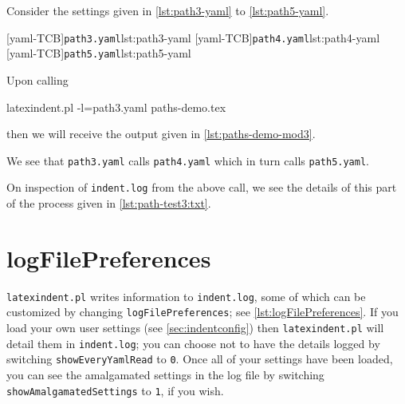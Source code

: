  \begin{example}
  Consider the settings given in \cref{lst:path3-yaml} to \cref{lst:path5-yaml}.

  \begin{cmhtcbraster}[raster columns=3,
    raster left skip=-3.5cm,
    raster right skip=-2cm,
    raster column skip=.03\linewidth]
   [yaml-TCB]{\texttt{path3.yaml}}{lst:path3-yaml}
   [yaml-TCB]{\texttt{path4.yaml}}{lst:path4-yaml}
   [yaml-TCB]{\texttt{path5.yaml}}{lst:path5-yaml}
  \end{cmhtcbraster}

  Upon calling

  \begin{commandshell}
latexindent.pl -l=path3.yaml paths-demo.tex
\end{commandshell}

  then we will receive the output given in \cref{lst:paths-demo-mod3}.


  We see that \texttt{path3.yaml} calls \texttt{path4.yaml} which in turn calls
  \texttt{path5.yaml}.

  On inspection of \texttt{indent.log} from the above call, we see the details of this
  part of the process given in \cref{lst:path-test3:txt}.

  \end{example}

 \section{logFilePreferences}\label{app:logfile-demo}

  \texttt{latexindent.pl} writes information to \texttt{indent.log}, some
  of which can be customized by changing \texttt{logFilePreferences}; see
  \cref{lst:logFilePreferences}. If you load your own user settings (see
  \vref{sec:indentconfig}) then \texttt{latexindent.pl} will detail them in
  \texttt{indent.log}; you can choose not to have the details logged by switching
  \texttt{showEveryYamlRead} to \texttt{0}. Once all of your settings have been loaded, you
  can see the amalgamated settings in the log file by switching
  \texttt{showAmalgamatedSettings} to \texttt{1}, if you wish.


